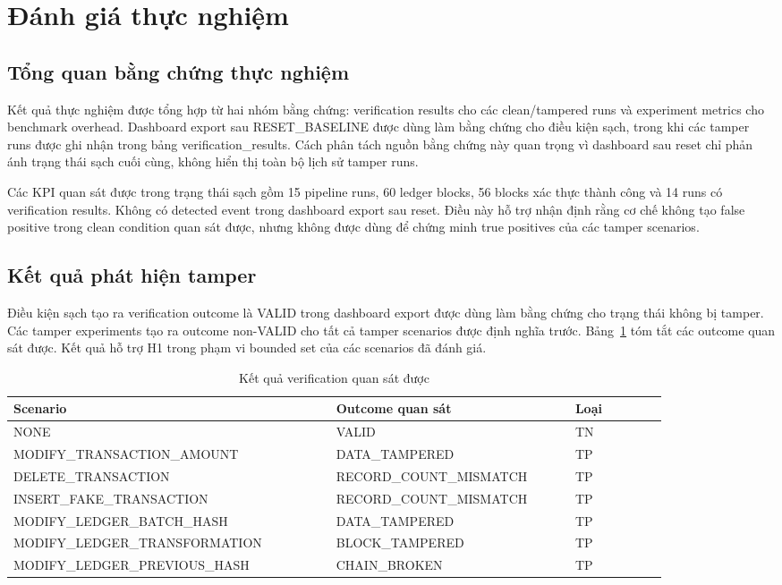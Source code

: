 \section{Đánh giá thực nghiệm}

\subsection{Tổng quan bằng chứng thực nghiệm}

Kết quả thực nghiệm được tổng hợp từ hai nhóm bằng chứng: verification results cho các clean/tampered runs và experiment metrics cho benchmark overhead. Dashboard export sau RESET\_BASELINE được dùng làm bằng chứng cho điều kiện sạch, trong khi các tamper runs được ghi nhận trong bảng verification\_results. Cách phân tách nguồn bằng chứng này quan trọng vì dashboard sau reset chỉ phản ánh trạng thái sạch cuối cùng, không hiển thị toàn bộ lịch sử tamper runs.

Các KPI quan sát được trong trạng thái sạch gồm 15 pipeline runs, 60 ledger blocks, 56 blocks xác thực thành công và 14 runs có verification results. Không có detected event trong dashboard export sau reset. Điều này hỗ trợ nhận định rằng cơ chế không tạo false positive trong clean condition quan sát được, nhưng không được dùng để chứng minh true positives của các tamper scenarios.

\subsection{Kết quả phát hiện tamper}

Điều kiện sạch tạo ra verification outcome là VALID trong dashboard export được dùng làm bằng chứng cho trạng thái không bị tamper. Các tamper experiments tạo ra outcome non-VALID cho tất cả tamper scenarios được định nghĩa trước. Bảng~\ref{tab:results} tóm tắt các outcome quan sát được. Kết quả hỗ trợ H1 trong phạm vi bounded set của các scenarios đã đánh giá.

\begin{table}[t]
\caption{Kết quả verification quan sát được}
\centering
\begin{tabular}{p{0.42\linewidth}p{0.31\linewidth}p{0.12\linewidth}}
\toprule
\textbf{Scenario} & \textbf{Outcome quan sát} & \textbf{Loại} \\
\midrule
NONE & VALID & TN \\
MODIFY\_TRANSACTION\_AMOUNT & DATA\_TAMPERED & TP \\
DELETE\_TRANSACTION & RECORD\_COUNT\_MISMATCH & TP \\
INSERT\_FAKE\_TRANSACTION & RECORD\_COUNT\_MISMATCH & TP \\
MODIFY\_LEDGER\_BATCH\_HASH & DATA\_TAMPERED & TP \\
MODIFY\_LEDGER\_TRANSFORMATION & BLOCK\_TAMPERED & TP \\
MODIFY\_LEDGER\_PREVIOUS\_HASH & CHAIN\_BROKEN & TP \\
\bottomrule
\end{tabular}
\label{tab:results}
\end{table}

